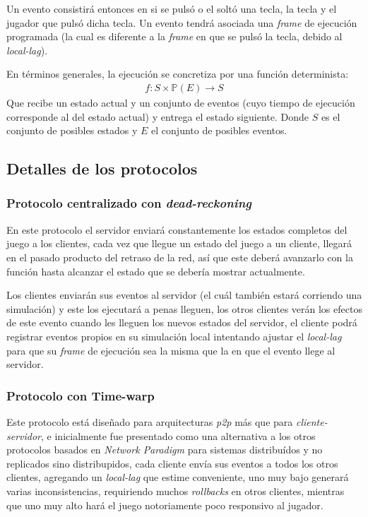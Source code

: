 Un evento consistirá entonces en si se pulsó o el soltó una tecla, la tecla y el jugador que pulsó dicha tecla. Un evento tendrá asociada una \emph{frame} de ejecución programada (la cual es diferente a la \emph{frame} en que se pulsó la tecla, debido al \emph{local-lag}).

En términos generales, la ejecución se concretiza por una función determinista:
\begin{align*}
    f : S \times \mathbb{P}(E) \rightarrow S
\end{align*}
Que recibe un estado actual y un conjunto de eventos (cuyo tiempo de ejecución corresponde al del estado actual) y entrega el estado siguiente. Donde $S$ es el conjunto de posibles estados y $E$ el conjunto de posibles eventos.


\subsection{Detalles de los protocolos}


\subsubsection{Protocolo centralizado con \emph{dead-reckoning}}

En este protocolo el servidor enviará constantemente los estados completos del juego a los clientes, cada vez que llegue un estado del juego a un cliente, llegará en el pasado producto del retraso de la red, así que este deberá avanzarlo con la función hasta alcanzar el estado que se debería mostrar actualmente.

Los clientes enviarán sus eventos al servidor (el cuál también estará corriendo una simulación) y este los ejecutará a penas lleguen, los otros clientes verán los efectos de este evento cuando les lleguen los nuevos estados del servidor, %
el cliente podrá registrar eventos propios en su simulación local intentando ajustar el \emph{local-lag} para que su \emph{frame} de ejecución sea la misma que la en que el evento llege al servidor.

\subsubsection{Protocolo con Time-warp}

Este protocolo está diseñado para arquitecturas \emph{p2p} más que para \emph{cliente-servidor}, e inicialmente fue presentado como una alternativa a los otros protocolos basados en \emph{Network Paradigm} para sistemas distribuídos y no replicados sino distribupidos, cada cliente envía sus eventos a todos los otros clientes, agregando un \emph{local-lag} que estime conveniente, uno muy bajo generará varias inconsistencias, requiriendo muchos \emph{rollbacks} en otros clientes, mientras que uno muy alto hará el juego notoriamente poco responsivo al jugador.

